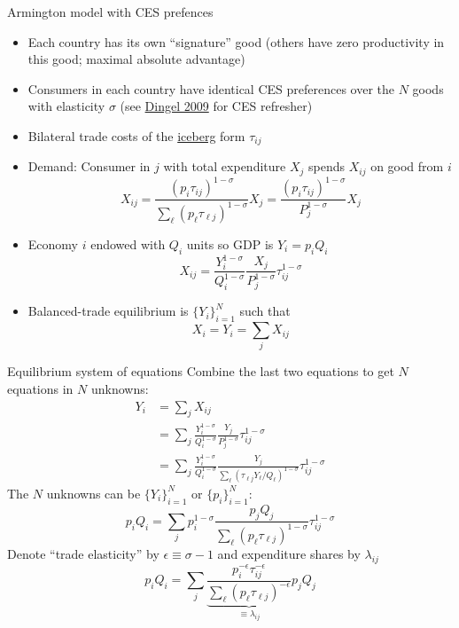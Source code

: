 \documentclass[10pt,notes=hide]{beamer}
\begin{document}
\begin{frame}{Armington model with CES prefences}
\begin{itemize}
	\item Each country has its own ``signature'' good (others have zero productivity in this good; maximal absolute advantage)
	\item Consumers in each country have identical CES preferences over the $N$ goods with elasticity $\sigma$
	(see \href{http://www.columbia.edu/~jid2106/td/dixitstiglitzbasics.pdf}{Dingel 2009} for CES refresher)
	\item Bilateral trade costs of the \href{https://tradediversion.net/2019/10/28/whats-an-iceberg-commuting-cost/}{iceberg} form $\tau_{ij}$
	\item Demand: Consumer in $j$ with total expenditure $X_j$ spends $X_{ij}$ on good from $i$
	\begin{equation*}
	X_{ij}	= \frac{(p_i\tau_{ij} )^{1-\sigma}}{\sum_{\ell} (p_\ell\tau_{\ell j})^{1-\sigma}} X_j
			= \frac{(p_i\tau_{ij} )^{1-\sigma}}{P_j^{1-\sigma}} X_j
	\end{equation*}
	\item Economy $i$ endowed with $Q_i$ units so GDP is $Y_i = p_i Q_i$
	\begin{equation*}
	X_{ij}	= \frac{Y_i^{1-\sigma}}{Q_i^{1-\sigma}} \frac{X_j}{P_j^{1-\sigma}}\tau_{ij}^{1-\sigma}
	\end{equation*}
	\item Balanced-trade equilibrium is $\{Y_i\}_{i=1}^{N}$ such that 
	\begin{equation*}
	X_i = Y_i = \sum_j X_{ij}
	\end{equation*}
\end{itemize}
\end{frame}
\begin{frame}{Equilibrium system of equations}
Combine the last two equations to get $N$ equations in $N$ unknowns:
\begin{align*}
Y_i 
&=
\sum_j X_{ij}
\\
&=
\sum_j \frac{Y_i^{1-\sigma}}{Q_i^{1-\sigma}} \frac{Y_j}{P_j^{1-\sigma}}\tau_{ij}^{1-\sigma}
\\
&=
\sum_j \frac{Y_i^{1-\sigma}}{Q_i^{1-\sigma}} \frac{Y_j}{\sum_{\ell} \left(\tau_{\ell j}Y_{\ell}/Q_{\ell}\right)^{1-\sigma}}\tau_{ij}^{1-\sigma}
\end{align*}
The $N$ unknowns can be $\{Y_i\}_{i=1}^{N}$ or $\{p_i\}_{i=1}^{N}$:
$$
p_i Q_i
=
\sum_j p_i^{1-\sigma} \frac{p_j Q_j}{\sum_{\ell} \left(p_{\ell} \tau_{\ell j}\right)^{1-\sigma}}\tau_{ij}^{1-\sigma}
$$
Denote ``trade elasticity'' by $\epsilon \equiv \sigma - 1$ and expenditure shares by $\lambda_{ij}$
$$
p_i Q_i
=
\sum_j \underbrace{\frac{p_i^{-\epsilon} \tau_{ij}^{-\epsilon}}{\sum_{\ell} \left(p_{\ell} \tau_{\ell j}\right)^{-\epsilon}}}_{\equiv \lambda_{ij}} p_j Q_j
$$
\end{frame}
\end{document}
